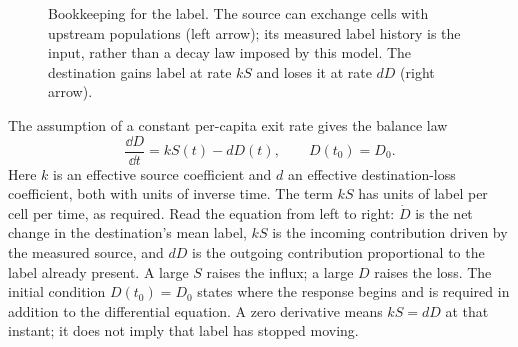 \begin{figure}[H]
\centering
{}
\caption{Bookkeeping for the label. The source can exchange cells with upstream populations (left arrow); its measured label history is the input, rather than a decay law imposed by this model. The destination gains label at rate $kS$ and loses it at rate $dD$ (right arrow).}\label{fig:lec02-source-destination}
\end{figure}

The assumption of a constant per-capita exit rate gives the balance law
\begin{equation}\label{eq:lec02:pulse-model}
\boxed{\frac{\dd D}{\dd t}=kS(t)-dD(t),\qquad D(t_0)=D_0.}
\end{equation}
Here $k$ is an effective source coefficient and $d$ an effective destination-loss coefficient, both with units of inverse time. The term $kS$ has units of label per cell per time, as required.
Read the equation from left to right: $\dot D$ is the net change in the destination's mean label, $kS$ is the incoming contribution driven by the measured source, and $dD$ is the outgoing contribution proportional to the label already present. A large $S$ raises the influx; a large $D$ raises the loss. The initial condition $D(t_0)=D_0$ states where the response begins and is required in addition to the differential equation. A zero derivative means $kS=dD$ at that instant; it does not imply that label has stopped moving.

